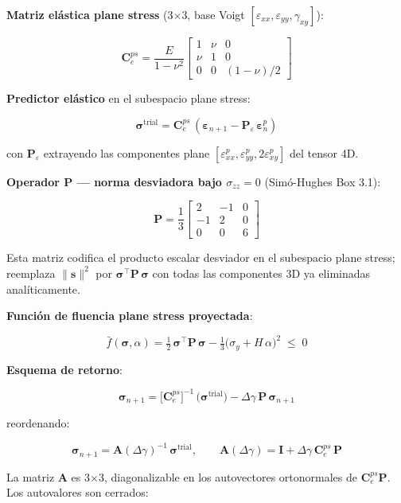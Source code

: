 \documentclass[11pt,letterpaper,oneside]{report}
\begin{document}
\textbf{Matriz elástica plane stress} (3\ensuremath{\times}3, base Voigt $[\varepsilon_{xx},\varepsilon_{yy},\gamma_{xy}]$):

\[
\mathbf C^{ps}_e = \frac{E}{1-\nu^2}\begin{bmatrix} 1 & \nu & 0 \\ \nu & 1 & 0 \\ 0 & 0 & (1-\nu)/2 \end{bmatrix}
\]

\textbf{Predictor elástico} en el subespacio plane stress:

\[
\boldsymbol\sigma^{\text{trial}} = \mathbf C^{ps}_e\,(\boldsymbol\varepsilon_{n+1} - \mathbf P_\varepsilon\,\boldsymbol\varepsilon^p_n)
\]

con $\mathbf P_\varepsilon$ extrayendo las componentes plane $[\varepsilon^p_{xx},\varepsilon^p_{yy},2\varepsilon^p_{xy}]$ del tensor 4D.

\textbf{Operador $\mathbf P$ --- norma desviadora bajo $\sigma_{zz}=0$} (Simó-Hughes Box 3.1):

\[
\mathbf P = \frac{1}{3}\begin{bmatrix} 2 & -1 & 0 \\ -1 & 2 & 0 \\ 0 & 0 & 6 \end{bmatrix}
\]

Esta matriz codifica el producto escalar desviador en el subespacio plane stress; reemplaza $\|\mathbf s\|^2$ por $\boldsymbol\sigma^\top \mathbf P\,\boldsymbol\sigma$ con todas las componentes 3D ya eliminadas analíticamente.

\textbf{Función de fluencia plane stress proyectada}:

\[
\bar f(\boldsymbol\sigma, \alpha) = \tfrac{1}{2}\,\boldsymbol\sigma^\top \mathbf P\,\boldsymbol\sigma - \tfrac{1}{3}\big(\sigma_y + H\,\alpha\big)^2 \;\leq\; 0
\]

\textbf{Esquema de retorno}:

\[
\boldsymbol\sigma_{n+1} = \big[\mathbf C^{ps}_e\big]^{-1}\,\big(\boldsymbol\sigma^{\text{trial}}\big) - \Delta\gamma\,\mathbf P\,\boldsymbol\sigma_{n+1}
\]

reordenando:

\[
\boldsymbol\sigma_{n+1} = \mathbf A(\Delta\gamma)^{-1}\,\boldsymbol\sigma^{\text{trial}}, \qquad \mathbf A(\Delta\gamma) = \mathbf I + \Delta\gamma\,\mathbf C^{ps}_e\,\mathbf P
\]

La matriz $\mathbf A$ es 3\ensuremath{\times}3, diagonalizable en los autovectores ortonormales de $\mathbf C^{ps}_e\mathbf P$. Los autovalores son cerrados:
\end{document}
